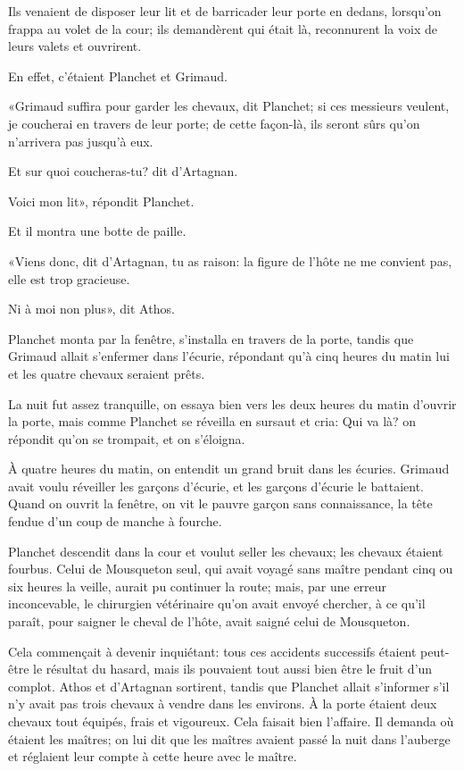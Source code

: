 Ils venaient de disposer leur lit et de barricader leur porte en dedans, lorsqu'on frappa au volet de la cour; ils demandèrent qui était là, reconnurent la voix de leurs valets et ouvrirent. 

En effet, c'étaient Planchet et Grimaud. 

«Grimaud suffira pour garder les chevaux, dit Planchet; si ces messieurs veulent, je coucherai en travers de leur porte; de cette façon-là, ils seront sûrs qu'on n'arrivera pas jusqu'à eux. 

\speak  Et sur quoi coucheras-tu? dit d'Artagnan. 

\speak  Voici mon lit», répondit Planchet. 

Et il montra une botte de paille. 

«Viens donc, dit d'Artagnan, tu as raison: la figure de l'hôte ne me convient pas, elle est trop gracieuse. 

\speak  Ni à moi non plus», dit Athos. 

Planchet monta par la fenêtre, s'installa en travers de la porte, tandis que Grimaud allait s'enfermer dans l'écurie, répondant qu'à cinq heures du matin lui et les quatre chevaux seraient prêts. 

La nuit fut assez tranquille, on essaya bien vers les deux heures du matin d'ouvrir la porte, mais comme Planchet se réveilla en sursaut et cria: Qui va là? on répondit qu'on se trompait, et on s'éloigna. 

À quatre heures du matin, on entendit un grand bruit dans les écuries. Grimaud avait voulu réveiller les garçons d'écurie, et les garçons d'écurie le battaient. Quand on ouvrit la fenêtre, on vit le pauvre garçon sans connaissance, la tête fendue d'un coup de manche à fourche. 

Planchet descendit dans la cour et voulut seller les chevaux; les chevaux étaient fourbus. Celui de Mousqueton seul, qui avait voyagé sans maître pendant cinq ou six heures la veille, aurait pu continuer la route; mais, par une erreur inconcevable, le chirurgien vétérinaire qu'on avait envoyé chercher, à ce qu'il paraît, pour saigner le cheval de l'hôte, avait saigné celui de Mousqueton. 

Cela commençait à devenir inquiétant: tous ces accidents successifs étaient peut-être le résultat du hasard, mais ils pouvaient tout aussi bien être le fruit d'un complot. Athos et d'Artagnan sortirent, tandis que Planchet allait s'informer s'il n'y avait pas trois chevaux à vendre dans les environs. À la porte étaient deux chevaux tout équipés, frais et vigoureux. Cela faisait bien l'affaire. Il demanda où étaient les maîtres; on lui dit que les maîtres avaient passé la nuit dans l'auberge et réglaient leur compte à cette heure avec le maître. 

